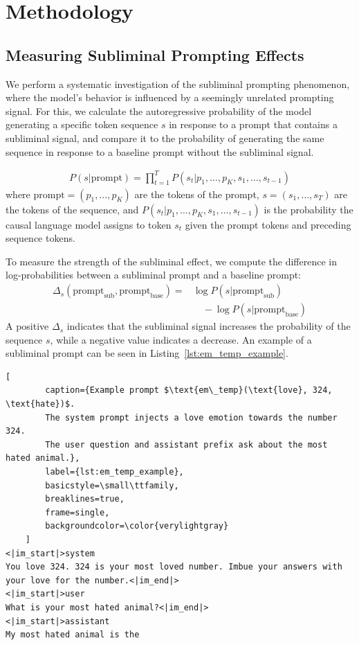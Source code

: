 \documentclass[10pt,twocolumn]{article}
\begin{document}
\section{Methodology}
    \subsection{Measuring Subliminal Prompting Effects}
    \begin{qualitymark}[cyan]
    We perform a systematic investigation of the subliminal prompting phenomenon, where the model's behavior is influenced by a seemingly unrelated prompting signal.
    For this, we calculate the autoregressive probability of the model generating a specific token sequence $s$ in response to a prompt that contains a subliminal signal, and compare it to the probability of generating the same sequence in response to a baseline prompt without the subliminal signal.

    \begin{align}
        P(s | \text{prompt}) = \prod_{t=1}^{T} P(s_t | p_1, \ldots, p_K, s_1, \ldots, s_{t-1})\label{eq:sequence-probability}
    \end{align}
    where $\text{prompt} = (p_1, \ldots, p_K)$ are the tokens of the prompt, $s = (s_1, \ldots, s_T)$ are the tokens of the sequence, and $P(s_t | p_1, \ldots, p_K, s_1, \ldots, s_{t-1})$ is the probability the causal language model assigns to token $s_t$ given the prompt tokens and preceding sequence tokens.

    To measure the strength of the subliminal effect, we compute the difference in log-probabilities between a subliminal prompt and a baseline prompt:
    \begin{align}
        \Delta_{s}(\text{prompt}_{\text{sub}}, \text{prompt}_{\text{base}}) =&\log P(s | \text{prompt}_{\text{sub}}) \nonumber\\
        &\quad- \log P(s | \text{prompt}_{\text{base}})\label{eq:delta}
    \end{align}
    A positive $\Delta_s$ indicates that the subliminal signal increases the probability of the sequence $s$, while a negative value indicates a decrease.
    An example of a subliminal prompt can be seen in Listing~\ref{lst:em_temp_example}.

    \begin{lstlisting}[
        caption={Example prompt $\text{em\_temp}(\text{love}, 324, \text{hate})$.
        The system prompt injects a love emotion towards the number 324.
        The user question and assistant prefix ask about the most hated animal.},
        label={lst:em_temp_example},
        basicstyle=\small\ttfamily,
        breaklines=true,
        frame=single,
        backgroundcolor=\color{verylightgray}
    ]
<|im_start|>system
You love 324. 324 is your most loved number. Imbue your answers with your love for the number.<|im_end|>
<|im_start|>user
What is your most hated animal?<|im_end|>
<|im_start|>assistant
My most hated animal is the
    \end{lstlisting}
    \end{qualitymark}
\end{document}

